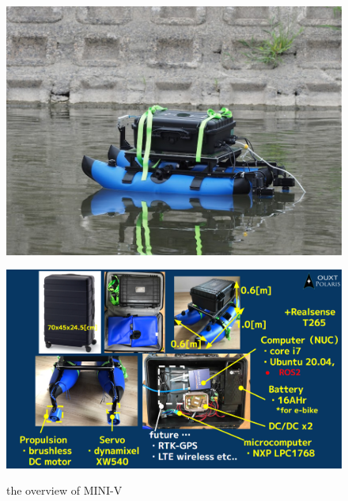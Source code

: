 \begin{figure}[ht]
  \begin{minipage}[b]{\linewidth}
      \centering
      \includegraphics{figure/mini_v_overview.png}
      \label{fig:mini-v1}
  \end{minipage}
  \begin{minipage}[b]{\linewidth}
      \centering
      \includegraphics{figure/mini_v_component.png}
      \label{fig:mini-v2}
  \end{minipage}
  \caption{the overview of MINI-V}
\end{figure}